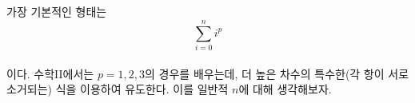\documentclass[a0,portrait]{a0poster}
\begin{document}
\begin{multicols}{2}

\color{DarkSlateGray} %

\section*{}

가장 기본적인 형태는
\[\sum_{i=0}^{n}i^p \] \\
이다. 수학II에서는 $p=1,2,3$의 경우를 배우는데, 더 높은 차수의 특수한(각 항이 서로 소거되는) 식을 이용하여 유도한다. 이를 일반적 $n$에 대해 생각해보자.


\end{multicols}
\end{document}
